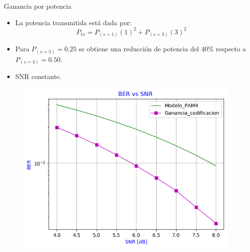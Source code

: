 \documentclass[xcolor=table]{beamer}
\begin{document}
\begin{frame}{Ganancia por potencia}
\begin{itemize}
    \item La potencia transmitida está dada por:
    \begin{equation*}
        P_{tx} = P_{(s = 1)}  (1)^{2} + P_{(s = 3)}  (3)^{2}
    \end{equation*}
    \item Para $ P_{(s = 3)}=0.25$ se obtiene una reducción de potencia del 40\% respecto a $ P_{(s = 3)}=0.50$.
    \item SNR constante. 
    \end{itemize}
\begin{figure}
  \centering
  \includegraphics[width=0.55\paperwidth]{Graficos/BER_vs_SNR_3.png}%
\end{figure}
\end{frame}
\end{document}

